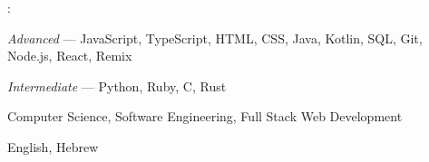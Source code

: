 
\begin{cvparagraph}
    : 
    \vspace{-1.0mm}
    \begin{plaincvitems}
        \item {\itshape Advanced} --- JavaScript, TypeScript, HTML, CSS, Java, Kotlin, SQL, Git, Node.js, React, Remix
        \item {\itshape Intermediate} --- Python, Ruby, C, Rust
    \end{plaincvitems}

     Computer Science, Software Engineering, Full Stack Web Development

     English, Hebrew
\end{cvparagraph}
